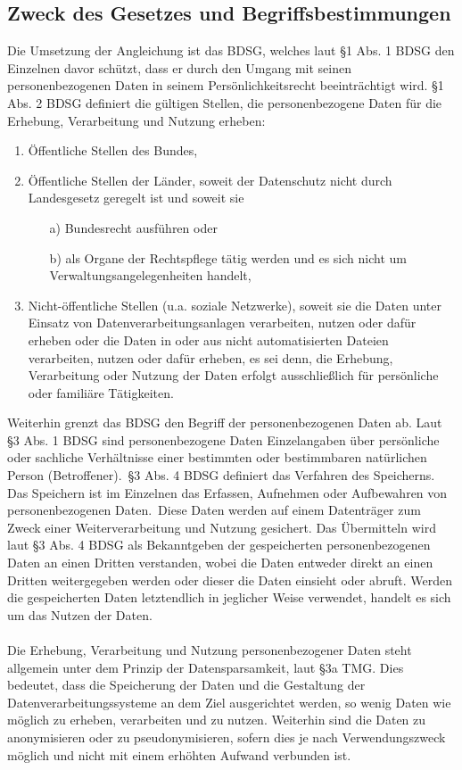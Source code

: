\subsection{Zweck des Gesetzes und Begriffsbestimmungen}
Die Umsetzung der Angleichung ist das BDSG, welches laut \S 1 Abs. 1 BDSG den Einzelnen davor schützt, dass er durch den Umgang mit seinen personenbezogenen Daten in seinem Persönlichkeitsrecht beeinträchtigt wird. \S 1 Abs. 2 BDSG definiert die gültigen Stellen, die personenbezogene Daten für die Erhebung, Verarbeitung und Nutzung erheben:
\begin{enumerate}
\item Öffentliche Stellen des Bundes,
\item Öffentliche Stellen der Länder, soweit der Datenschutz nicht durch Landesgesetz geregelt ist und soweit sie
\begin{itemize}
\item[a)] Bundesrecht ausführen oder
\item[b)] als Organe der Rechtspflege tätig werden und es sich nicht um Verwaltungsangelegenheiten handelt,
\end{itemize}
\item Nicht-öffentliche Stellen (u.a. soziale Netzwerke), soweit sie die Daten unter Einsatz von Datenverarbeitungsanlagen verarbeiten, nutzen oder dafür erheben oder die Daten in oder aus nicht automatisierten Dateien verarbeiten, nutzen oder dafür erheben, es sei denn, die Erhebung, Verarbeitung oder Nutzung der Daten erfolgt ausschließlich für persönliche oder familiäre Tätigkeiten.
\end{enumerate}
Weiterhin grenzt das BDSG den Begriff der personenbezogenen Daten ab. Laut \S 3 Abs. 1 BDSG \glqq sind personenbezogene Daten Einzelangaben über persönliche oder sachliche Verhältnisse einer bestimmten oder bestimmbaren natürlichen Person (Betroffener).\grqq \ \S 3 Abs. 4 BDSG definiert das Verfahren des Speicherns. Das Speichern ist im Einzelnen das \glqq Erfassen, Aufnehmen oder Aufbewahren von personenbezogenen Daten.\grqq \ Diese Daten werden auf einem Datenträger zum Zweck einer Weiterverarbeitung und Nutzung gesichert. Das Übermitteln wird laut \S 3 Abs. 4 BDSG als Bekanntgeben der gespeicherten personenbezogenen Daten an einen Dritten verstanden, wobei die Daten entweder direkt an einen Dritten weitergegeben werden oder dieser die Daten einsieht oder abruft. Werden die gespeicherten Daten letztendlich in jeglicher Weise verwendet, handelt es sich um das Nutzen der Daten.\\
\\Die Erhebung, Verarbeitung und Nutzung personenbezogener Daten steht allgemein unter dem Prinzip der Datensparsamkeit, laut \S 3a TMG. Dies bedeutet, dass die Speicherung der Daten und die Gestaltung der Datenverarbeitungssysteme an dem Ziel ausgerichtet werden, so wenig Daten wie möglich zu erheben, verarbeiten und zu nutzen. Weiterhin sind die Daten zu anonymisieren oder zu pseudonymisieren, sofern dies je nach Verwendungszweck möglich und nicht mit einem erhöhten Aufwand verbunden ist.
